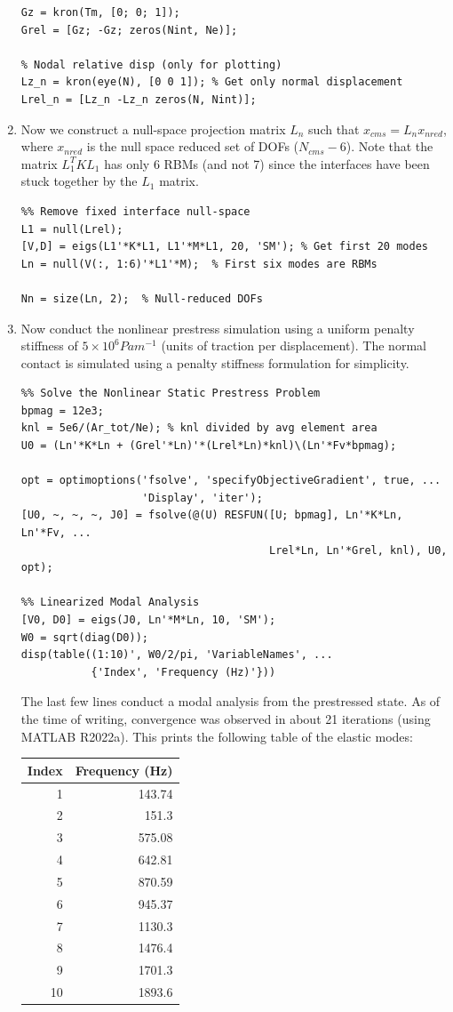 \documentclass[11pt]{article}
\begin{document}
\begin{enumerate}
\begin{verbatim}
Gz = kron(Tm, [0; 0; 1]);
Grel = [Gz; -Gz; zeros(Nint, Ne)];

% Nodal relative disp (only for plotting)
Lz_n = kron(eye(N), [0 0 1]); % Get only normal displacement
Lrel_n = [Lz_n -Lz_n zeros(N, Nint)];
\end{verbatim}
\item Now we construct a null-space projection matrix \(L_n\) such that \(x_{cms} = L_n x_{nred}\), where \(x_{nred}\) is the null space reduced set of DOFs (\(N_{cms}-6\)).
Note that the matrix \(L_1^T K L_1\) has only 6 RBMs (and not 7) since the interfaces have been stuck together by the \(L_1\) matrix.
\begin{verbatim}
%% Remove fixed interface null-space
L1 = null(Lrel);
[V,D] = eigs(L1'*K*L1, L1'*M*L1, 20, 'SM'); % Get first 20 modes
Ln = null(V(:, 1:6)'*L1'*M);  % First six modes are RBMs

Nn = size(Ln, 2);  % Null-reduced DOFs
\end{verbatim}
\item Now conduct the nonlinear prestress simulation using a uniform penalty stiffness of \(5\times 10^6 Pa m^{-1}\) (units of traction per displacement).
The normal contact is simulated using a penalty stiffness formulation for simplicity.
\begin{verbatim}
%% Solve the Nonlinear Static Prestress Problem
bpmag = 12e3;
knl = 5e6/(Ar_tot/Ne); % knl divided by avg element area
U0 = (Ln'*K*Ln + (Grel'*Ln)'*(Lrel*Ln)*knl)\(Ln'*Fv*bpmag);

opt = optimoptions('fsolve', 'specifyObjectiveGradient', true, ...
                   'Display', 'iter');
[U0, ~, ~, ~, J0] = fsolve(@(U) RESFUN([U; bpmag], Ln'*K*Ln, Ln'*Fv, ...
                                       Lrel*Ln, Ln'*Grel, knl), U0, opt);

%% Linearized Modal Analysis
[V0, D0] = eigs(J0, Ln'*M*Ln, 10, 'SM');
W0 = sqrt(diag(D0));
disp(table((1:10)', W0/2/pi, 'VariableNames', ...
           {'Index', 'Frequency (Hz)'}))
\end{verbatim}
The last few lines conduct a modal analysis from the prestressed state.
As of the time of writing, convergence was observed in about 21 iterations (using MATLAB R2022a).
This prints the following table of the elastic modes:
\begin{center}
\begin{tabular}{rr}
Index & Frequency (Hz)\\[0pt]
\hline
1 & 143.74\\[0pt]
2 & 151.3\\[0pt]
3 & 575.08\\[0pt]
4 & 642.81\\[0pt]
5 & 870.59\\[0pt]
6 & 945.37\\[0pt]
7 & 1130.3\\[0pt]
8 & 1476.4\\[0pt]
9 & 1701.3\\[0pt]
10 & 1893.6\\[0pt]
\end{tabular}
\end{center}
\end{enumerate}
\end{document}
